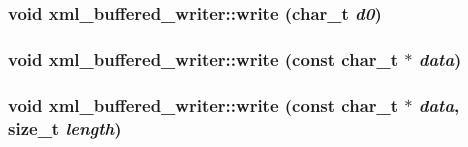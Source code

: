 \label{classxml__buffered__writer_a4cd6e908908e17c9b07eba34f7317791}
\hypertarget{classxml__buffered__writer_a1aa829bd551a69dd9005d2d46063308f}{
\subsubsection[{write}]{\setlength{\rightskip}{0pt plus 5cm}void xml\_\-buffered\_\-writer::write (char\_\-t {\em d0})}}
\label{classxml__buffered__writer_a1aa829bd551a69dd9005d2d46063308f}
\hypertarget{classxml__buffered__writer_af4181dcf2610619ba4f35d86c3d66372}{
\subsubsection[{write}]{\setlength{\rightskip}{0pt plus 5cm}void xml\_\-buffered\_\-writer::write (const char\_\-t $\ast$ {\em data})}}
\label{classxml__buffered__writer_af4181dcf2610619ba4f35d86c3d66372}
\hypertarget{classxml__buffered__writer_af830f04deffd7e28122d8c8973707c94}{
\subsubsection[{write}]{\setlength{\rightskip}{0pt plus 5cm}void xml\_\-buffered\_\-writer::write (const char\_\-t $\ast$ {\em data}, \/  size\_\-t {\em length})}}
\label{classxml__buffered__writer_af830f04deffd7e28122d8c8973707c94}


